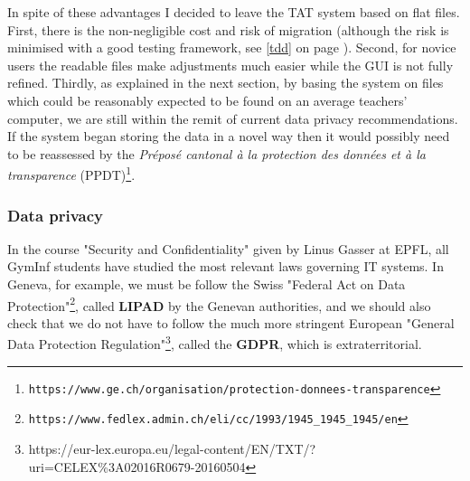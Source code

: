 \documentclass[10pt]{article}
\begin{document}
In spite of these advantages I decided to leave the TAT system based on flat files. First, there is the non-negligible cost and risk of migration (although the risk is minimised with a good testing framework, see \ref{tdd} on page \pageref{tdd}). Second, for novice users the readable files make adjustments much easier while the GUI is not fully refined. Thirdly, as explained in the next section, by basing the system on files which could be reasonably expected to be found on an average teachers' computer, we are still within the remit of current data privacy recommendations. If the system began storing the data in a novel way then it would possibly need to be reassessed by the \emph{Préposé cantonal à la protection des données et à la transparence} (PPDT)\footnote{\texttt{https://www.ge.ch/organisation/protection-donnees-transparence}}.

\subsubsection{Data privacy} \label{dataprivacy}

In the course "Security and Confidentiality" given by Linus Gasser at EPFL, all GymInf students have studied the most relevant laws governing IT systems. In Geneva, for example, we must be follow the Swiss "Federal Act on Data Protection"\footnote{\texttt{https://www.fedlex.admin.ch/eli/cc/1993/1945\_1945\_1945/en}}, called \textbf{LIPAD} by the Genevan authorities, and we should also check that we do not have to follow the much more stringent European "General Data Protection Regulation"\footnote{https://eur-lex.europa.eu/legal-content/EN/TXT/?uri=CELEX\%3A02016R0679-20160504}, called the \textbf{GDPR}, which is extraterritorial.
\end{document}
